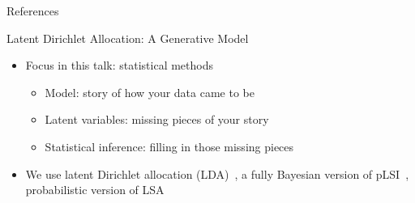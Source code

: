 \documentclass[compress]{beamer}
\begin{document}
\begin{frame}{References}

\tiny

\end{frame}



\begin{frame}{Latent Dirichlet Allocation: A Generative Model}

\begin{itemize}
\item Focus in this talk: statistical methods
  \begin{itemize}
    \item Model: story of how your data came to be
    \item Latent variables: missing pieces of your story
    \item Statistical inference: filling in those missing pieces
  \end{itemize}
\item We use latent Dirichlet allocation (LDA)~\cite{blei-03}, a fully Bayesian
  version of pLSI~\cite{hofmann-99}, probabilistic version of
  LSA~\cite{landauer-97}
\end{itemize}

\end{frame}
\end{document}
